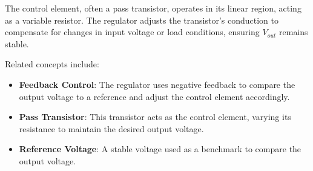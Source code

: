 The control element, often a pass transistor, operates in its linear region, acting as a variable resistor. The regulator adjusts the transistor's conduction to compensate for changes in input voltage or load conditions, ensuring \( V_{out} \) remains stable.

Related concepts include:
\begin{itemize}
    \item \textbf{Feedback Control}: The regulator uses negative feedback to compare the output voltage to a reference and adjust the control element accordingly.
    \item \textbf{Pass Transistor}: This transistor acts as the control element, varying its resistance to maintain the desired output voltage.
    \item \textbf{Reference Voltage}: A stable voltage used as a benchmark to compare the output voltage.
\end{itemize}

